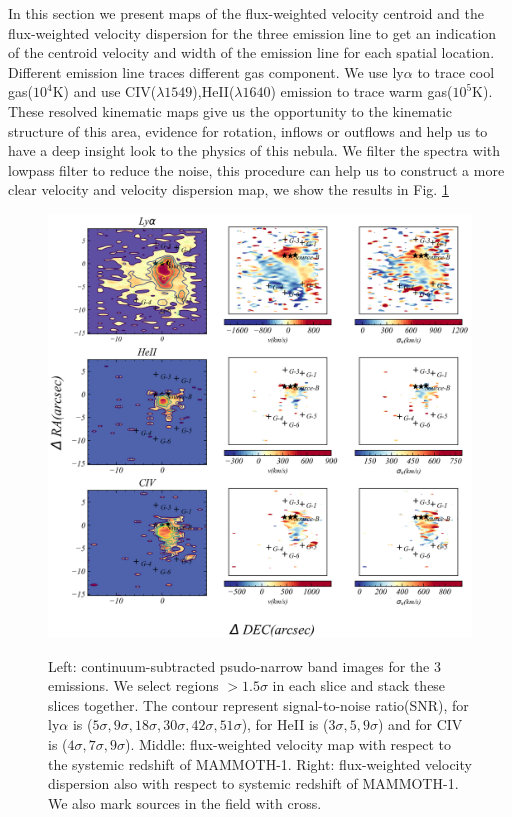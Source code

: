 \documentclass[../Results.tex]{subfiles}
\begin{document}
	In this section we present maps of the flux-weighted velocity centroid and the flux-weighted velocity dispersion for the three emission line to get an indication of the centroid velocity and width of the emission line for each spatial location. Different emission line traces different gas component. We use ly$\alpha$ to trace cool gas($10^{4}$K) and use CIV($\lambda1549$),HeII($\lambda1640$) emission to trace warm gas($10^{5}$K).  These resolved kinematic maps give us the opportunity to the kinematic structure of this area, evidence for rotation, inflows or outflows and help us to have a deep insight look to the physics of this nebula. We filter the spectra with lowpass filter to reduce the noise, this procedure can help us to construct a more clear velocity and velocity dispersion map, we show the results in Fig. \ref{kinematicsmap}
	 \begin{figure}[htp]
		\centering
		\includegraphics[width=\textwidth]{figs/emissionmap}
		\label{kinematicsmap}
		\caption{Left: continuum-subtracted psudo-narrow band images for the 3 emissions. We select regions $> 1.5\sigma$ in each slice and stack these slices together. The contour represent signal-to-noise ratio(SNR), for ly$\alpha$ is ($5\sigma,9\sigma,18\sigma,30\sigma,42\sigma,51\sigma$), for HeII is ($3\sigma,5,9\sigma$) and for CIV is ($4\sigma,7\sigma,9\sigma$). Middle: flux-weighted velocity map with respect to the systemic redshift of MAMMOTH-1. Right: flux-weighted velocity dispersion also with respect to systemic redshift of MAMMOTH-1. We also mark sources in the field with cross.}
	\end{figure}
	
\end{document}
